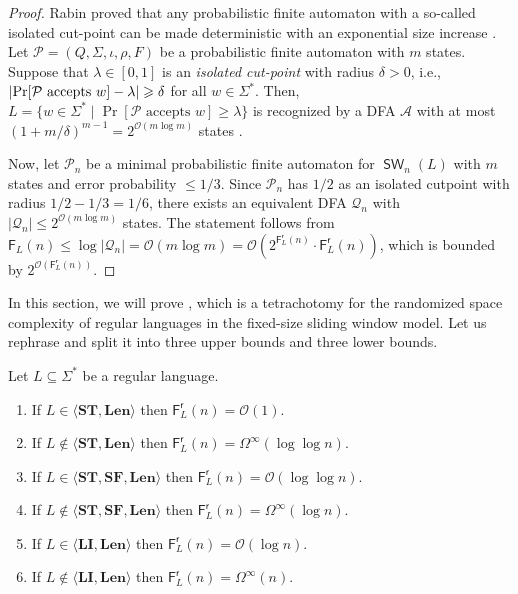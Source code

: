 \documentclass{theoretics}
\newcommand{\A}{\mathcal{A}}
\renewcommand{\O}{\mathcal{O}}
\renewcommand{\P}{\mathcal{P}}
\newcommand{\Q}{\mathcal{Q}}
\newcommand{\F}{\mathsf{F}}
\renewcommand{\r}{\mathsf{r}}
\DeclareMathOperator{\SW}{\mathsf{SW}}
\newcommand{\Len}{\mathbf{Len}}
\newcommand{\LI}{\mathbf{LI}}
\newcommand{\ST}{\mathbf{ST}}
\newcommand{\SF}{\mathbf{SF}}
\DeclarePairedDelimiter{\abs}{\lvert}{\rvert}
\renewcommand{\geq}{\geqslant}
\renewcommand{\leq}{\leqslant}
\renewcommand{\ge}{\geq}
\renewcommand{\le}{\leq}
\newcommand{\Omegainf}{\Omega^{\scriptscriptstyle{\infty}}}
\begin{document}
\begin{proof}
	Rabin proved that any probabilistic finite automaton with a so-called isolated cut-point
	can be made deterministic with an exponential size increase \cite{Rabin63}.
	Let $\P = (Q,\Sigma,\iota,\rho,F)$ be a probabilistic finite automaton with $m$ states.
	Suppose that $\lambda \in [0,1]$ is an {\em isolated cut-point} with radius $\delta > 0$,
	i.e.,~$\abs{\Pr[\P \text{ accepts } w] - \lambda} \ge \delta$ for all $w \in \Sigma^*$.
	Then, $L = \{ w \in \Sigma^* \mid \Pr[\P \text{ accepts } w] \ge \lambda \}$
	is recognized by a DFA $\A$ with at most $(1 + m/\delta)^{m-1} = 2^{\O(m \log m)}$ states
	\cite[Theorem~3]{Rabin63}.

	Now, let $\P_n$ be a minimal probabilistic finite automaton for $\SW_n(L)$ with $m$ states and error probability $\leq 1/3$.
	Since $\P_n$ has $1/2$ as an isolated cutpoint with radius $1/2-1/3 = 1/6$,
	there exists an equivalent DFA $\Q_n$ with $|\Q_n| \le 2^{\O(m \log m)}$ states.
	The statement follows from
	$\F_L(n) \le \log |\Q_n| = \O(m \log m) = \O(2^{\F^\r_L(n)} \cdot \F^\r_L(n))$,
	which is bounded by $2^{\O(\F^\r_L(n))}$.
\end{proof}

In this section, we will prove ,
which is a tetrachotomy for the randomized space complexity of regular languages
in the fixed-size sliding window model.
Let us rephrase  and split it into three upper bounds and three lower bounds.

\begin{theorem}\label{thm:tetrachotomy}
	Let $L \subseteq \Sigma^*$ be a regular language.
	\begin{enumerate}[label=(\arabic{*}), ref=(\arabic{*})]
	\item \label{point-O(1)} If $L \in \langle \ST, \Len \rangle$
	then $\F^\r_L(n) = \O(1)$.
	\item \label{lower-loglog} If $L \notin \langle \ST, \Len \rangle$
	then $\F^\r_L(n) = \Omegainf(\log \log n)$.
	\item \label{upper-loglog} If $L \in \langle \ST, \SF, \Len \rangle$
	then $\F^\r_L(n) = \O(\log \log n)$.
	\item \label{lower-log} If $L \notin \langle \ST, \SF, \Len \rangle$
	then $\F^\r_L(n) = \Omegainf(\log n)$.
	\item \label{point-O(log)} If $L \in \langle \LI, \Len \rangle$
	then $\F^\r_L(n) = \O(\log n)$.
	\item \label{lower-lin} If $L \notin \langle \LI, \Len \rangle$
	then $\F^\r_L(n) = \Omegainf(n)$.
	\end{enumerate}
\end{theorem}
\end{document}
